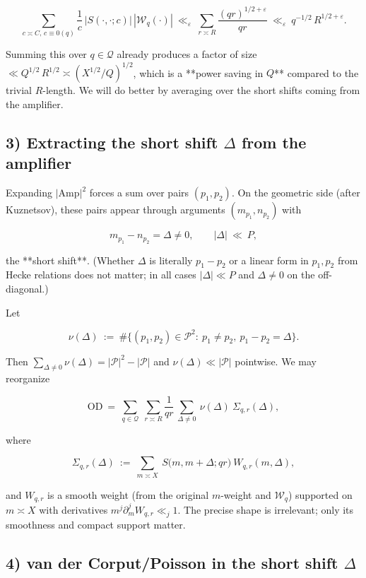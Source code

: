 \documentclass[11pt]{article}
\theoremstyle{definition}
\theoremstyle{remark}
\begin{document}
$$
\sum_{c\asymp C,\, c\equiv 0(q)} \frac{1}{c}\,|S(\cdot,\cdot;c)|\,|\mathcal W_q(\cdot)|\ \ll_\varepsilon\ \sum_{r\asymp R} \frac{(qr)^{1/2+\varepsilon}}{qr}\ \ll_\varepsilon\ q^{-1/2}\,R^{1/2+\varepsilon}.
$$

Summing this over $q\in\mathcal Q$ already produces a factor of size $\ll Q^{1/2}\,R^{1/2}\asymp (X^{1/2}/Q)^{1/2}$, which is a **power saving in $Q$** compared to the trivial $R$-length. We will do better by averaging over the short shifts coming from the amplifier.

\subsection*{3) Extracting the short shift $\Delta$ from the amplifier}

Expanding $|\mathrm{Amp}|^2$ forces a sum over pairs $(p_1,p_2)$. On the geometric side (after Kuznetsov), these pairs appear through arguments $(m_{p_1},n_{p_2})$ with

$$
m_{p_1}-n_{p_2}=\Delta\ne 0,\qquad |\Delta|\ \ll\ P,
$$

the **short shift**. (Whether $\Delta$ is literally $p_1-p_2$ or a linear form in $p_1,p_2$ from Hecke relations does not matter; in all cases $|\Delta|\ll P$ and $\Delta\ne0$ on the off-diagonal.)

Let

$$
\nu(\Delta)\ :=\ \#\{(p_1,p_2)\in\mathcal P^2:\ p_1\ne p_2,\ p_1-p_2=\Delta\}.
$$

Then $\sum_{\Delta\ne 0}\nu(\Delta)=|\mathcal P|^2-|\mathcal P|$ and $\nu(\Delta)\ll |\mathcal P|$ pointwise. We may reorganize

$$
\mathrm{OD}\ =\ \sum_{q\in\mathcal Q}\;\sum_{r\asymp R}\frac{1}{qr}\,\sum_{\Delta\ne 0}\ \nu(\Delta)\ 
\Sigma_{q,r}(\Delta),
$$

where

$$
\Sigma_{q,r}(\Delta)\ :=\ \sum_{m\asymp X}\ S\!\big(m,m+\Delta;qr\big)\ W_{q,r}(m,\Delta),
$$

and $W_{q,r}$ is a smooth weight (from the original $m$-weight and $\mathcal W_q$) supported on $m\asymp X$ with derivatives $m^j\partial_m^j W_{q,r}\ll_j 1$. The precise shape is irrelevant; only its smoothness and compact support matter.

\subsection*{4) van der Corput/Poisson in the short shift $\Delta$}
\end{document}
